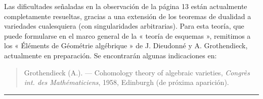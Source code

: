 \documentclass[11pt,twoside,openany]{book}
\numberwithin{equation}{section}
\theoremstyle{plain}
\theoremstyle{definition}
\theoremstyle{remark}
\theoremstyle{plain}
\theoremstyle{definition}
\theoremstyle{remark}
\begin{document}
Las dificultades señaladas en la observación de la página 13 están actualmente
completamente resueltas, gracias a una extensión de los teoremas de dualidad a
variedades cualesquiera (con singularidades arbitrarias). Para esta teoría, que puede
formularse en el marco general de la « teoría de esquemas », remitimos
a los « Éléments de Géométrie algébrique » de J. Dieudonné y A. Grothendieck,
actualmente en preparación. Se encontrarán algunas indicaciones en:

\begin{quote}
Grothendieck (A.). --- Cohomology theory of algebraic varieties,
\emph{Congrès int. des Mathématiciens}, 1958, Edinburgh (de próxima aparición).
\end{quote}

\begin{flushright}
[Abril de 1959]
\end{flushright}

\begin{center}\rule{36mm}{0.5pt}\end{center}
\end{document}
